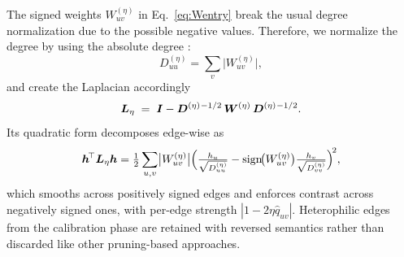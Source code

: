 The signed weights $W^{(\eta)}_{uv}$ in Eq.~\eqref{eq:Wentry} break the usual degree normalization due to the possible negative values.
Therefore, we normalize the degree by using the absolute degree \citep{KunegisSigned}:
\begin{equation}
D^{(\eta)}_{uu}=\textstyle\sum_v \bigl|W^{(\eta)}_{uv}\bigr|,
\label{eq:degreelaplacian}
\end{equation}
and create the Laplacian accordingly
\begin{equation}
\bm{L}_{\eta} \;=\; \bm{I}-\bm{D}^{(\eta)}{}^{-1/2}\,\bm{W}^{(\eta)}\,\bm{D}^{(\eta)}{}^{-1/2}.
\label{eq:laplacian}
\end{equation}
Its quadratic form decomposes edge-wise as
\begin{equation}
\bm{h}^{\!\top}\bm{L}_{\eta}\bm{h}
=\tfrac12\sum_{u,v}\bigl|W^{(\eta)}_{uv}\bigr|
\Bigl(\tfrac{h_u}{\sqrt{D^{(\eta)}_{uu}}}-\operatorname{sign}\!\bigl(W^{(\eta)}_{uv}\bigr)\tfrac{h_v}{\sqrt{D^{(\eta)}_{vv}}}\Bigr)^{\!2},
\label{eq:quadform}
\end{equation}
which smooths across positively signed edges and enforces contrast across negatively signed ones, with per-edge strength $|1-2\eta \hat{q}_{uv}|$.
Heterophilic edges from the calibration phase are retained with reversed semantics rather than discarded like other pruning-based approaches.


